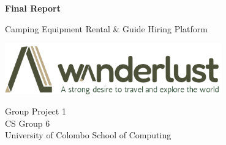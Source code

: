 \begin{titlepage}
	\begin{center}
		\vspace*{1cm}


{\fontsize{30}{30}\selectfont \textbf{Final Report}}

    
	

		\vspace{1.5cm}

  {\fontsize{20}{30}\selectfont Camping Equipment Rental \& Guide Hiring Platform}
		

		\vspace{1.5cm}
		\vfill
	\includegraphics[width=0.7\textwidth]{Images/logo.png}
		\vfill

		\vspace{0.8cm}


		Group Project 1\\ CS Group 6\\

	\vspace{0.5\baselineskip}	
	{University of Colombo School of Computing} 
 
    \vspace*{6\baselineskip} 

	\end{center}
\end{titlepage}